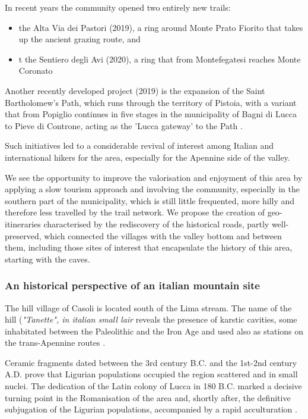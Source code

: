\documentclass[sustainability,article,submit,pdftex,moreauthors]{Definitions/mdpi}
\begin{document}
In recent years the community opened two entirely new trails:
\begin{itemize}
	\item the Alta Via dei Pastori (2019), a ring around Monte Prato Fiorito that takes up the ancient grazing route, and
	\item t the Sentiero degli Avi (2020), a ring that from Montefegatesi
	reaches Monte Coronato \cite{pin21}
\end{itemize}

Another recently developed project (2019) is the expansion of the Saint Bartholomew's Path, which runs through the territory of Pistoia, with a
variant that from Popiglio continues in five stages in the municipality of Bagni di Lucca to Pieve di Controne, acting as the 'Lucca gateway' to the Path \cite{camsb}.

Such initiatives led to a considerable revival of interest among Italian and international hikers for the area, especially for the Apennine side of the valley.

We see the opportunity to improve the valorisation and enjoyment of this area by applying a slow tourism approach and involving the community, especially in the southern part of the municipality, which is still little frequented, more hilly and therefore less travelled by the trail network. We propose the creation of geo-itineraries characterised by the rediscovery of the historical roads, partly well-preserved, which connected the villages with the valley bottom and between them, including those sites of interest that encapsulate the history of this area, starting with the caves.

\subsubsection{An historical perspective of an italian mountain site}

 The hill village of Casoli is located south of the Lima stream. The name of the hill ({\em "Tanette", in italian small lair} reveals the presence of karstic cavities, some inhabitated between the Paleolithic and the Iron Age and used also as stations on the trans-Apennine routes \cite{men76, gia96, pal63, zec72a, zec72b}.

Ceramic fragments dated between the 3rd century B.C. and the 1st-2nd century A.D. prove that Ligurian populations occupied the region scattered and in small nuclei. The dedication of the Latin colony of Lucca in 180 B.C. marked a decisive turning point in the Romanisation of the area and, shortly after, the definitive subjugation of the Ligurian populations, accompanied by a rapid acculturation \cite{gia96, cia05}.
\end{document}
